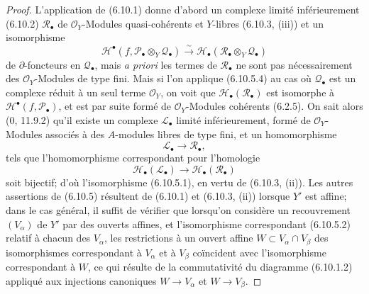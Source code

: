 \begin{proof}
L'application de (6.10.1) donne d'abord un complexe limité inférieurement
(6.10.2) $\mathscr R_\bullet$ de $\mathscr O_Y$-Modules quasi-cohérents et
$Y$-libres (6.10.3, (iii)) et un isomorphisme
\[
  \mathscr H^\bullet
  (f,\mathscr P_\bullet\otimes_Y\mathscr Q_\bullet)
  \xrightarrow{\sim}
  \mathscr H_\bullet
  (\mathscr R_\bullet\otimes_Y\mathscr Q_\bullet)
  \tag{6.10.5.4}\label{III.6.10.5.4.fr}
\]
de $\partial$-foncteurs en $\mathscr Q_\bullet$, mais \emph{a priori} les
termes de $\mathscr R_\bullet$ ne sont pas nécessairement des
$\mathscr O_Y$-Modules de type fini. Mais si l'on applique (6.10.5.4) au cas
où $\mathscr Q_\bullet$ est un complexe réduit à un seul terme
$\mathscr O_Y$, on voit que $\mathscr H_\bullet(\mathscr R_\bullet)$ est
isomorphe à $\mathscr H^\bullet(f,\mathscr P_\bullet)$, et est par suite formé
de $\mathscr O_Y$-Modules cohérents (6.2.5). On sait alors (0, 11.9.2) qu'il
existe un complexe $\mathscr L_\bullet$ limité inférieurement, formé de
$\mathscr O_Y$-Modules associés à des $A$-modules libres de type fini, et un
homomorphisme
\[
  \mathscr L_\bullet\longrightarrow\mathscr R_\bullet,
\]
tels que l'homomorphisme correspondant pour l'homologie
\[
  \mathscr H_\bullet(\mathscr L_\bullet)
  \longrightarrow
  \mathscr H_\bullet(\mathscr R_\bullet)
\]
soit bijectif; d'où l'isomorphisme (6.10.5.1), en vertu de (6.10.3, (ii)).
Les autres assertions de (6.10.5) résultent de (6.10.1) et (6.10.3, (ii))
lorsque $Y'$ est affine; dans le cas général, il suffit de vérifier que
lorsqu'on considère un recouvrement $(V_\alpha)$ de $Y'$ par des ouverts
affines, et l'isomorphisme correspondant (6.10.5.2) relatif à chacun des
$V_\alpha$, les restrictions à un ouvert affine
$W\subset V_\alpha\cap V_\beta$ des isomorphismes correspondant à
$V_\alpha$ et à $V_\beta$ coïncident avec l'isomorphisme correspondant à
$W$, ce qui résulte de la commutativité du diagramme (6.10.1.2) appliqué aux
injections canoniques $W\to V_\alpha$ et $W\to V_\beta$.
\end{proof}

